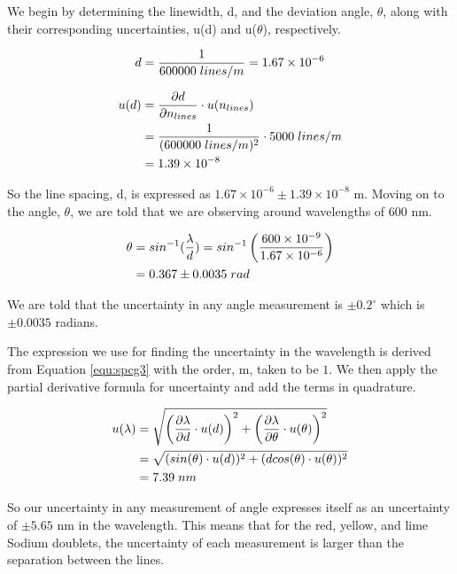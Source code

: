 \begin{enumerate}
We begin by determining the linewidth, d, and the deviation angle, $\theta$, along with their corresponding uncertainties, u(d) and u($\theta$), respectively.

\begin{equation}
d=\dfrac{1}{600000\hspace{1mm}lines/m}=1.67\times10^{-6}
\label{equ:spcg6}
\end{equation}



\begin{align}
u(d)&=\dfrac{\partial d}{\partial n_{lines}}\cdot u(n_{lines})\\
&=\dfrac{1}{(600000\hspace{1mm}lines/m)^2}\cdot 5000\hspace{1mm}lines/m\\
&=1.39\times10^{-8}
\label{equ:spcg7}
\end{align}

\noindent So the line spacing, d, is expressed as $1.67\times10^{-6}\pm1.39\times10^{-8}$ m. Moving on to the angle, $\theta$, we are told that we are observing around wavelengths of 600 nm.

\begin{align}
\theta&=sin^{-1}(\dfrac{\lambda}{d})=sin^{-1}\left(\dfrac{600\times10^{-9}}{1.67\times10^{-6}}\right)\\
&=0.367\pm 0.0035\hspace{1mm}rad
\label{equ:spcg8}
\end{align}

\noindent We are told that the uncertainty in any angle measurement is $\pm 0.2^{\circ}$ which is $\pm 0.0035$ radians.

The expression we use for finding the uncertainty in the wavelength is derived from Equation \ref{equ:spcg3} with the order, m, taken to be $1$. We then apply the partial derivative formula for uncertainty and add the terms in quadrature.

\begin{align}
u(\lambda)&=\sqrt{\left(\dfrac{\partial \lambda}{\partial d}\cdot u(d)\right)^2+\left(\dfrac{\partial \lambda}{\partial \theta}\cdot u(\theta)\right)^2}\\
&=\sqrt{(sin(\theta)\cdot u(d))^2+(dcos(\theta)\cdot u(\theta))^2}\\
&=7.39\hspace{1mm}nm
\label{equ:spcg9}
\end{align}

So our uncertainty in any measurement of angle expresses itself as an uncertainty of $\pm5.65$ nm in the wavelength. This means that for the red, yellow, and lime Sodium doublets, the uncertainty of each measurement is larger than the separation between the lines.

\end{enumerate}


